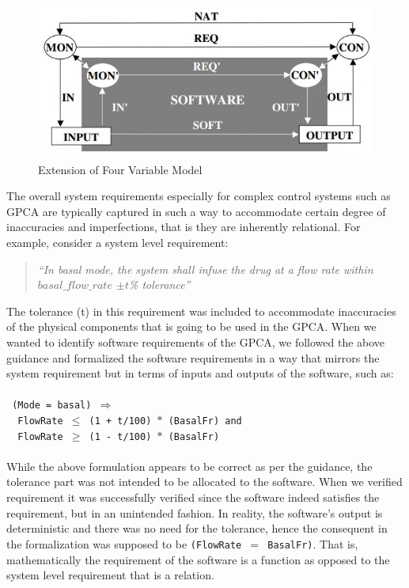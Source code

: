 \vspace{-0.1in}
\begin{figure}[h!]
    \centering
    \includegraphics[scale=0.5] {images/FourVarExtn.jpg}
    \caption{Extension of Four Variable Model}
    \label{fig:extn-four-var}
 \end{figure}
\vspace{-0.1in}

The overall system requirements especially for complex control systems such as GPCA are typically captured in such a way to accommodate certain degree of inaccuracies and imperfections, that is they are inherently relational. For example, consider a system level requirement:

\begin{quotation}
\emph{``In basal mode, the system shall infuse the drug at a flow rate within $basal\_flow\_rate$ $\pm t$\% tolerance''}
\end{quotation}

The tolerance (t) in this requirement was included to accommodate inaccuracies of the physical components that is going to be used in the GPCA. When we wanted to identify software requirements of the GPCA, we followed the above guidance and formalized the software requirements in a way that mirrors the system requirement but in terms of inputs and outputs of the software, such as:
\\\\
\footnotesize{\texttt{
(Mode = basal) $\Rightarrow$\\
\textcolor{white}{------}FlowRate $\leq$ (1 + t/100) $\ast$ (BasalFr) and \\
\textcolor{white}{------}FlowRate $\geq$ (1 - t/100) $\ast$ (BasalFr)\\
}}
\normalsize{}\\
While the above formulation appears to be correct as per the guidance, the tolerance part was not intended to be allocated to the software. When we verified requirement it was successfully verified since the software indeed satisfies the requirement, but in an unintended fashion. In reality, the software's output is deterministic and there was no need for the tolerance, hence the consequent in the formalization was supposed to be \texttt{(FlowRate $=$ BasalFr)}. That is, mathematically the requirement of the software is a function as opposed to the system level requirement that is a relation. %

